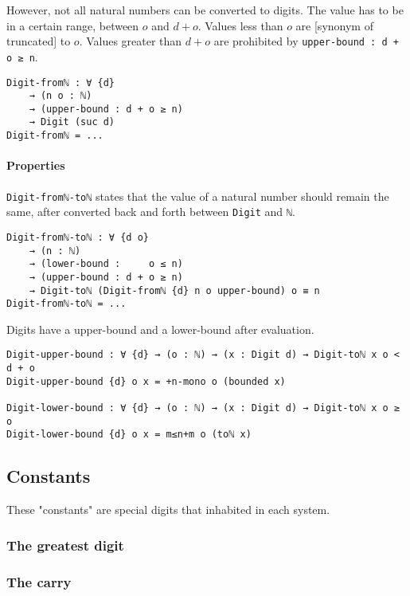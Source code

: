 \documentclass[../thesis.tex]{subfiles}
\begin{document}
However, not all natural numbers can be converted to digits.
The value has to be in a certain range, between $ o $ and $ d + o $.
Values less than $ o $ are [synonym of truncated] to $ o $.
Values greater than $ d + o $ are prohibited by {\lstinline|upper-bound : d + o ≥ n|}.

\begin{lstlisting}
Digit-fromℕ : ∀ {d}
    → (n o : ℕ)
    → (upper-bound : d + o ≥ n)
    → Digit (suc d)
Digit-fromℕ = ...
\end{lstlisting}


\paragraph{Properties}
{\lstinline|Digit-fromℕ-toℕ|} states that the value of a natural number should
remain the same, after converted back and forth between {\lstinline|Digit|} and
{\lstinline|ℕ|}.

\begin{lstlisting}
Digit-fromℕ-toℕ : ∀ {d o}
    → (n : ℕ)
    → (lower-bound :     o ≤ n)
    → (upper-bound : d + o ≥ n)
    → Digit-toℕ (Digit-fromℕ {d} n o upper-bound) o ≡ n
Digit-fromℕ-toℕ = ...
\end{lstlisting}

Digits have a upper-bound and a lower-bound after evaluation.

\begin{lstlisting}
Digit-upper-bound : ∀ {d} → (o : ℕ) → (x : Digit d) → Digit-toℕ x o < d + o
Digit-upper-bound {d} o x = +n-mono o (bounded x)

Digit-lower-bound : ∀ {d} → (o : ℕ) → (x : Digit d) → Digit-toℕ x o ≥ o
Digit-lower-bound {d} o x = m≤n+m o (toℕ x)
\end{lstlisting}


\subsection{Constants}

These "constants" are special digits that inhabited in each system.



\subsubsection{The greatest digit}

\subsubsection{The carry}
\end{document}
